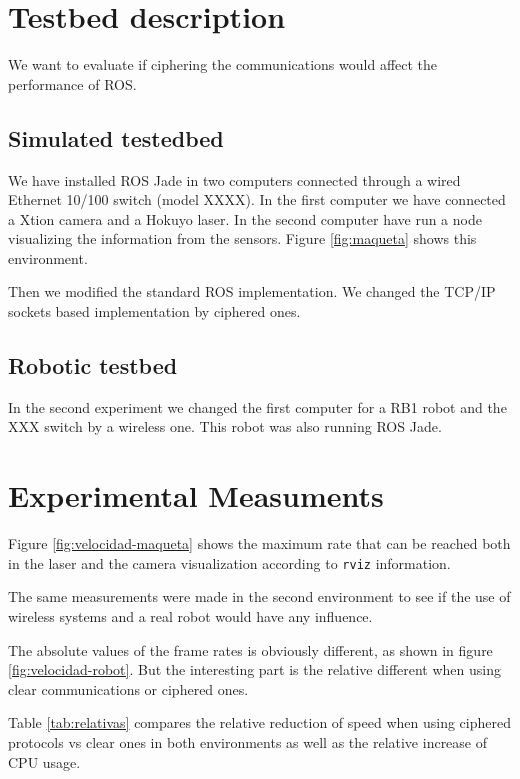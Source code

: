 \documentclass[journal,twoside]{JoPhA}
\begin{document}
\section{Testbed description}

We want to evaluate if ciphering the communications would affect the performance of ROS. 


\subsection{Simulated testedbed}

We have installed ROS Jade in two computers connected through a wired Ethernet 10/100 switch (model XXXX). In the first computer we have connected a Xtion camera and a Hokuyo laser. In the second computer have run a node visualizing the information from the sensors. Figure \ref{fig:maqueta} shows this environment.


Then we modified the standard ROS implementation. We changed the TCP/IP sockets based implementation by ciphered ones.


\subsection{Robotic testbed}

In the second experiment we changed the first computer for a RB1 robot and the XXX switch by a wireless one. This robot was also running ROS Jade.



\section{Experimental Measuments}

Figure \ref{fig:velocidad-maqueta} shows the maximum rate that can be reached both in the laser and the camera visualization according to \texttt{rviz} information.

The same measurements were made in the second environment to see if the use of wireless systems and a real robot would have any influence.

The absolute values of the frame rates is obviously different, as shown in figure \ref{fig:velocidad-robot}. But the interesting part is the relative different when using clear communications or ciphered ones. 

Table \ref{tab:relativas}  compares the relative reduction of speed when using ciphered protocols vs clear ones in both environments as well as the relative increase of CPU usage.
\end{document}
